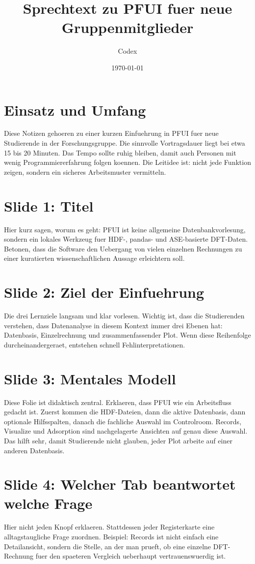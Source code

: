 \documentclass[11pt,a4paper]{article}
\title{Sprechtext zu PFUI fuer neue Gruppenmitglieder}
\author{Codex}
\date{\today}
\begin{document}
\maketitle

\section*{Einsatz und Umfang}
Diese Notizen gehoeren zu einer kurzen Einfuehrung in PFUI fuer neue Studierende in der Forschungsgruppe. Die sinnvolle Vortragsdauer liegt bei etwa 15 bis 20 Minuten. Das Tempo sollte ruhig bleiben, damit auch Personen mit wenig Programmiererfahrung folgen koennen. Die Leitidee ist: nicht jede Funktion zeigen, sondern ein sicheres Arbeitsmuster vermitteln.

\section*{Slide 1: Titel}
Hier kurz sagen, worum es geht: PFUI ist keine allgemeine Datenbankvorlesung, sondern ein lokales Werkzeug fuer HDF-, pandas- und ASE-basierte DFT-Daten. Betonen, dass die Software den Uebergang von vielen einzelnen Rechnungen zu einer kuratierten wissenschaftlichen Aussage erleichtern soll.

\section*{Slide 2: Ziel der Einfuehrung}
Die drei Lernziele langsam und klar vorlesen. Wichtig ist, dass die Studierenden verstehen, dass Datenanalyse in diesem Kontext immer drei Ebenen hat: Datenbasis, Einzelrechnung und zusammenfassender Plot. Wenn diese Reihenfolge durcheinandergeraet, entstehen schnell Fehlinterpretationen.

\section*{Slide 3: Mentales Modell}
Diese Folie ist didaktisch zentral. Erklaeren, dass PFUI wie ein Arbeitsfluss gedacht ist. Zuerst kommen die HDF-Dateien, dann die aktive Datenbasis, dann optionale Hilfsspalten, danach die fachliche Auswahl im Controlroom. Records, Visualize und Adsorption sind nachgelagerte Ansichten auf genau diese Auswahl. Das hilft sehr, damit Studierende nicht glauben, jeder Plot arbeite auf einer anderen Datenbasis.

\section*{Slide 4: Welcher Tab beantwortet welche Frage}
Hier nicht jeden Knopf erklaeren. Stattdessen jeder Registerkarte eine alltagstaugliche Frage zuordnen. Beispiel: Records ist nicht einfach eine Detailansicht, sondern die Stelle, an der man prueft, ob eine einzelne DFT-Rechnung fuer den spaeteren Vergleich ueberhaupt vertrauenswuerdig ist.
\end{document}
